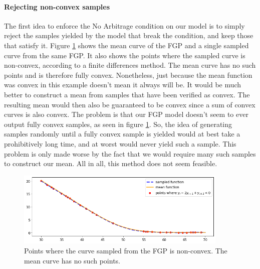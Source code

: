 \documentclass[a4paper,12pt]{article}
\begin{document}
\paragraph{Rejecting non-convex samples}
The first idea to enforce the No Arbitrage condition on our model is to simply reject the samples yielded by the model that break the condition, and keep those that satisfy it. Figure \ref{fig:fgp_concave_points} shows the mean curve of the FGP and a single sampled curve from the same FGP. It also shows the points where the sampled curve is non-convex, according to a finite differences method. The mean curve has no such points and is therefore fully convex. Nonetheless, just because the mean function was convex in this example doesn't mean it always will be. It would be much better to construct a mean from samples that have been verified as convex. The resulting mean would then also be guaranteed to be convex since a sum of convex curves is also convex. The problem is that our FGP model doesn't seem to ever output fully convex samples, as seen in figure \ref{fig:fgp_concave_points}. So, the idea of generating samples randomly until a fully convex sample is yielded would at best take a prohibitively long time, and at worst would never yield such a sample. This problem is only made worse by the fact that we would require many such samples to construct our mean. All in all, this method does not seem feasible.
\begin{figure} [H]
    \centering
    \includegraphics[width=0.9\textwidth]{na_cond_concave_points.png}
    \caption{Points where the curve sampled from the FGP is non-convex. The mean curve has no such points.}
    \label{fig:fgp_concave_points}
\end{figure}
\end{document}
